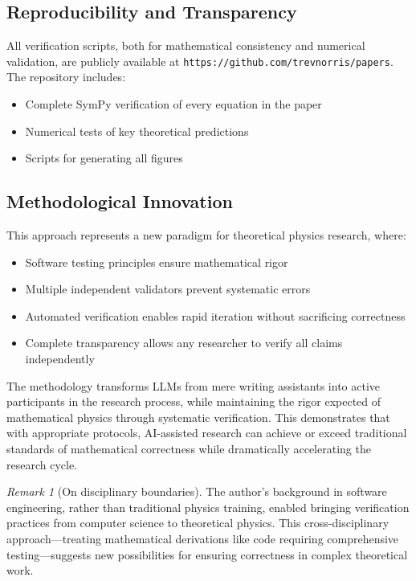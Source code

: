 \documentclass[11pt]{article}
\theoremstyle{remark}
\newtheorem{remark}{Remark}
\theoremstyle{definition}
\begin{document}
\subsection{Reproducibility and Transparency}
All verification scripts, both for mathematical consistency and numerical validation, are publicly available at \texttt{https://github.com/trevnorris/papers}. The repository includes:
\begin{itemize}
\item Complete SymPy verification of every equation in the paper
\item Numerical tests of key theoretical predictions
\item Scripts for generating all figures
\end{itemize}

\subsection{Methodological Innovation}
This approach represents a new paradigm for theoretical physics research, where:
\begin{itemize}
\item Software testing principles ensure mathematical rigor
\item Multiple independent validators prevent systematic errors
\item Automated verification enables rapid iteration without sacrificing correctness
\item Complete transparency allows any researcher to verify all claims independently
\end{itemize}

The methodology transforms LLMs from mere writing assistants into active participants in the research process, while maintaining the rigor expected of mathematical physics through systematic verification. This demonstrates that with appropriate protocols, AI-assisted research can achieve or exceed traditional standards of mathematical correctness while dramatically accelerating the research cycle.

\begin{remark}[On disciplinary boundaries]
The author's background in software engineering, rather than traditional physics training, enabled bringing verification practices from computer science to theoretical physics. This cross-disciplinary approach—treating mathematical derivations like code requiring comprehensive testing—suggests new possibilities for ensuring correctness in complex theoretical work.
\end{remark}
\end{document}
